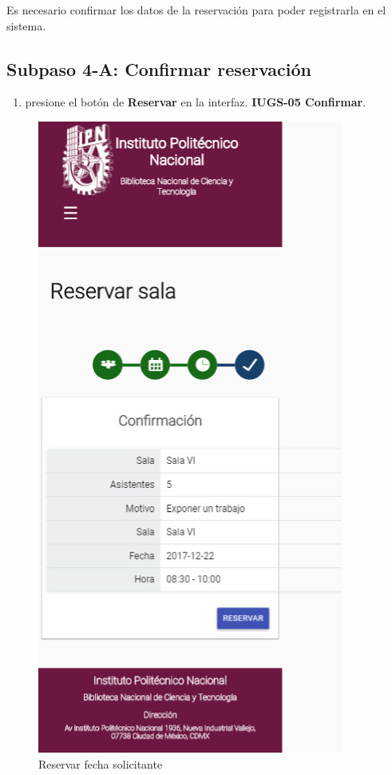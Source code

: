 Es necesario confirmar los datos de la reservación para
poder registrarla en el sistema.

\subsection{Subpaso 4-A: Confirmar reservación}
\begin{enumerate}
	\item presione el botón de \textbf{Reservar} en la interfaz.
		\textbf{IUGS-05 Confirmar}.
\end{enumerate}

\begin{figure}
	\includegraphics[scale=0.3]{images/InterfazMovil/IUGS02_reservarConfirmar.png}
		\caption{Reservar fecha solicitante}
	\end{figure}
	
